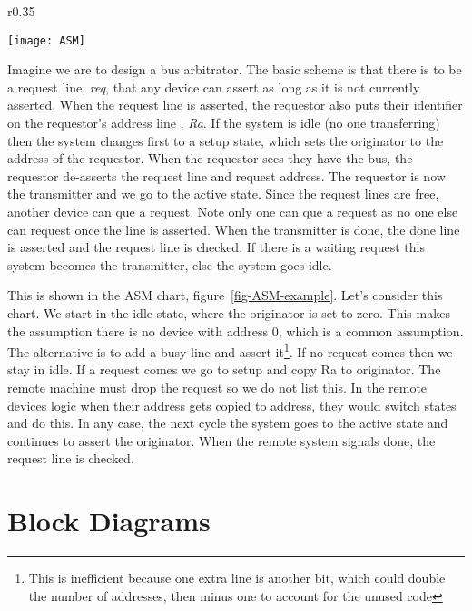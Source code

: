 
\begin{wrapfigure}{r}{0.35\textwidth}
\vspace*{-.45in}
\begin{center}
\caption{ASM Chart of Bus Arbitrator.}\label{fig-ASM-example}
\texttt{[image: ASM]}
\end{center}
\end{wrapfigure}

Imagine we are to design a bus arbitrator.  The basic scheme is that there is to be a request line, \emph{req}, that any device can assert as long as it is not currently asserted.  When the request line is asserted, the requestor also puts their identifier on the requestor's address line , \emph{Ra}.  If the system is idle (no one transferring) then the system changes first to a setup state, which sets the originator to the address of the requestor.  When the requestor sees they have the bus, the requestor de-asserts the request line and request address.  The requestor is now the transmitter and we go to the active state.  Since the request lines are free, another device can que a request.  Note only one can que a request as no one else can request once the line is asserted.  When the transmitter is done, the done line is asserted and the request line is checked.  If there is a waiting request this system becomes the transmitter, else the system goes idle.


This is shown in the ASM chart, figure~\ref{fig-ASM-example}.  Let's consider this chart.  We start in the idle state, where the originator is set to zero.  This makes the assumption there is no device with address 0, which is a common assumption.  The alternative is to add a busy line and assert it\footnote{This is inefficient because one extra line is another bit, which could double the number of addresses, then minus one to account for the unused code}.  If no request comes then we stay in idle.  If a request comes we go to setup and copy Ra to originator.  The remote machine must drop the request so we do not list this.  In the remote devices logic when their address gets copied to address, they would switch states and do this.  In any case, the next cycle the system goes to the active state and continues to assert the originator.  When the remote system signals done, the request line is checked.

\clearpage

\section{Block Diagrams}




